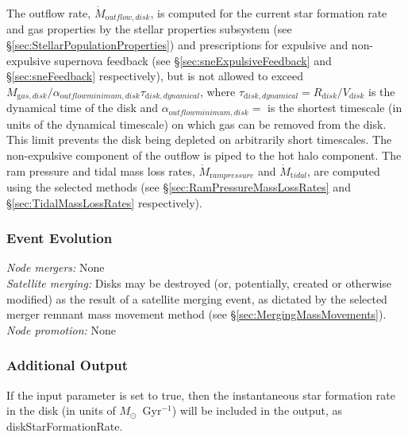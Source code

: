 The outflow rate, $\dot{M}_{\mathrm outflow, disk}$, is computed for the current star formation rate and gas properties by the stellar properties subsystem (see \S\ref{sec:StellarPopulationProperties}) and prescriptions for expulsive and non-expulsive supernova feedback (see \S\ref{sec:sneExpulsiveFeedback} and \S\ref{sec:sneFeedback} respectively), but is not allowed to exceed $M_{\mathrm gas, disk}/ \alpha_{\mathrm outflow minimum, disk} \tau_{\mathrm disk, dynamical}$, where $\tau_{\mathrm disk, dynamical}=R_{\mathrm disk}/V_{\mathrm disk}$ is the dynamical time of the disk and $\alpha_{\mathrm outflow minimum, disk}=${\normalfont \ttfamily [diskOutflowTimescaleMinimum]} is the shortest timescale (in units of the dynamical timescale) on which gas can be removed from the disk. This limit prevents the disk being depleted on arbitrarily short timescales. The non-expulsive \gls{component} of the outflow is piped to the hot halo component.  The ram pressure and tidal mass loss rates, $\dot{M}_{\mathrm ram pressure}$ and $\dot{M}_{\mathrm tidal}$, are computed using the selected methods (see \S\ref{sec:RamPressureMassLossRates} and \S\ref{sec:TidalMassLossRates} respectively).

\subsubsection{Event Evolution}

\noindent\emph{Node mergers:} None\\

\noindent\emph{Satellite merging:} Disks may be destroyed (or, potentially, created or otherwise modified) as the result of a satellite merging event, as dictated by the selected merger remnant mass movement method (see \S\ref{sec:MergingMassMovements}).\\

\noindent\emph{Node promotion:} None\\

\subsubsection{Additional Output}

If the {\normalfont \ttfamily [diskOutputStarFormationRate]} input parameter is set to true, then the instantaneous star formation rate in the disk (in units of $M_\odot$~Gyr$^{-1}$) will be included in the output, as {\normalfont \ttfamily diskStarFormationRate}.

